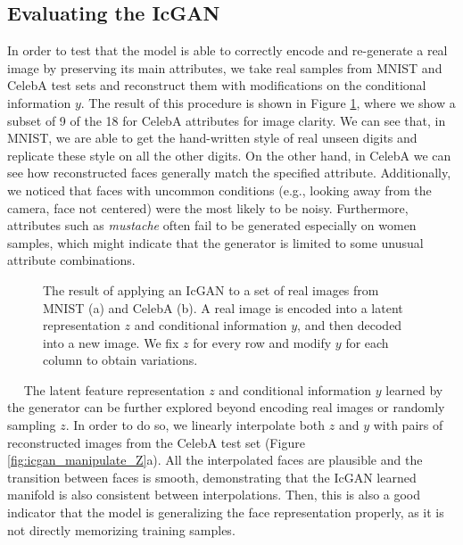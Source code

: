 \documentclass{article}
\newcommand{\minisection}[1]{\vspace{0.04in} \noindent {\bf #1}\ \ }
\begin{document}
\subsection{Evaluating the IcGAN}

In order to test that the model is able to correctly encode and re-generate a real image by preserving its main attributes, we take real samples from MNIST and CelebA test sets and reconstruct them with modifications on the conditional information $y$. The result of this procedure is shown in Figure \ref{fig:icgan_analogies}, where we show a subset of 9 of the 18 for CelebA attributes for image clarity. We can see that, in MNIST, we are able to get the hand-written style of real unseen digits and replicate these style on all the other digits. On the other hand, in CelebA we can see how reconstructed faces generally match the specified attribute. Additionally, we noticed that faces with uncommon conditions (e.g., looking away from the camera, face not centered) were the most likely to be noisy. Furthermore, attributes such as \textit{mustache} often fail to be generated especially on women samples, which might indicate that the generator is limited to some unusual attribute combinations. 

\begin{figure}[t]
		\centering
        \newline
        \caption{The result of applying an IcGAN to a set of real images from MNIST (a) and CelebA (b). A real image is encoded into a latent representation $z$ and conditional information $y$, and then decoded into a new image. We fix $z$ for every row and modify $y$ for each column to obtain variations.} \label{fig:icgan_analogies}
\end{figure}

\minisection{Manipulating the latent space} \label{exp:icgan:latent}
The latent feature representation $z$ and conditional information $y$ learned by the generator can be further explored beyond encoding real images or randomly sampling $z$. In order to do so, we linearly interpolate both $z$ and $y$ with pairs of reconstructed images from the CelebA test set (Figure \ref{fig:icgan_manipulate_Z}a). All the interpolated faces are plausible and the transition between faces is smooth, demonstrating that the IcGAN learned manifold is also consistent between interpolations. Then, this is also a good indicator that the model is generalizing the face representation properly, as it is not directly memorizing training samples.
\end{document}
